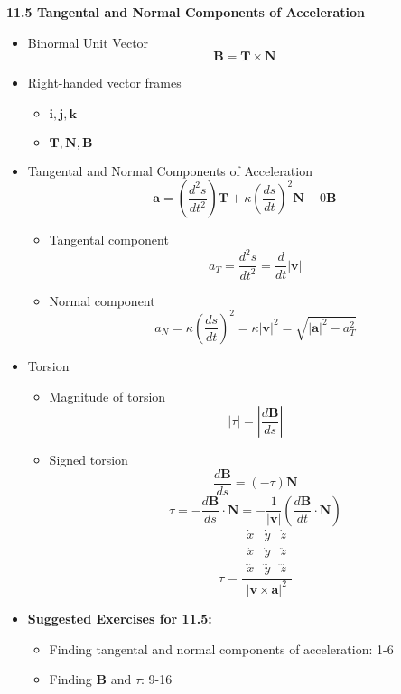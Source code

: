 \documentclass[12pt]{article}
\renewcommand{\vec}[1]{\mathbf{#1}}
\newcommand{\veci}{\mathbf{i}}
\newcommand{\vecj}{\mathbf{j}}
\newcommand{\veck}{\mathbf{k}}
\newcommand{\<}{\left<}
\renewcommand{\>}{\right>}
\begin{document}
\newpage

\centerline{\bf 11.5 Tangental and Normal Components of Acceleration}

  \begin{itemize}
  
    \item Binormal Unit Vector
      \[\vec{B} = \vec{T} \times \vec{N}\]

    \item Right-handed vector frames
      \begin{itemize}
        \item $\veci,\vecj,\veck$
        \item $\vec{T},\vec{N},\vec{B}$
      \end{itemize}
      
    \item Tangental and Normal Components of Acceleration
      \[\vec{a} = \left(\frac{d^2s}{dt^2}\right)\vec{T} + \kappa\left(\frac{ds}{dt}\right)^2\vec{N}+0\vec{B}\]
      \begin{itemize}
        \item Tangental component
          \[a_T = \frac{d^2s}{dt^2} = \frac{d}{dt}|\vec{v}| \]
        \item Normal component
          \[a_N = \kappa\left(\frac{ds}{dt}\right)^2 = \kappa|\vec{v}|^2 = \sqrt{|\vec{a}|^2 - a_T^2}\]
      \end{itemize}
    
    \item Torsion
      \begin{itemize}
        \item Magnitude of torsion
          \[|\tau| = \left|\frac{d\vec{B}}{ds}\right|\]
        \item Signed torsion
          \[\frac{d\vec{B}}{ds} = (-\tau)\vec{N}\]
          \[\tau = -\frac{d\vec{B}}{ds}\cdot \vec{N} = -\frac{1}{|\vec{v}|}\left(\frac{d\vec{B}}{dt}\cdot\vec{N}\right)\]
          \[
            \tau
            =
            \frac{
            \begin{array}{|ccc|}
            \dot{x} & \dot{y} & \dot{z} \\
            \ddot{x} & \ddot{y} & \ddot{z} \\
            \dddot{x} & \dddot{y} & \dddot{z}
            \end{array}
            }{
            |\vec{v}\times\vec{a}|^2
            }
          \]
      \end{itemize}
      
    \item \textbf{ Suggested Exercises for 11.5:}
    
      \begin{itemize}
      \item Finding tangental and normal components of acceleration: 1-6
      \item Finding $\vec{B}$ and $\tau$: 9-16
      \end{itemize}
  
  \end{itemize}
\end{document}
